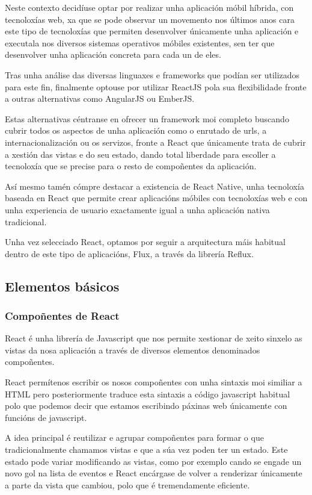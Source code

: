     Neste contexto decidíuse optar por realizar unha aplicación móbil 
híbrida, con tecnoloxías web, xa que se pode observar un movemento nos últimos 
anos cara este tipo de tecnoloxías que permiten desenvolver únicamente unha 
aplicación e executala nos diversos sistemas operativos móbiles existentes, sen 
ter que desenvolver unha aplicación concreta para cada un de eles.

    Tras unha análise das diversas linguaxes e frameworks que podían 
ser utilizados para este fin, finalmente optouse por utilizar ReactJS pola sua 
flexibilidade fronte a outras alternativas como AngularJS ou EmberJS.

    Estas alternativas céntranse en ofrecer un framework moi completo buscando 
cubrir todos os aspectos de unha aplicación como o enrutado 
de urls, a internacionalización ou os servizos, fronte a React que únicamente 
trata de cubrir a xestión das vistas e do seu estado, dando total liberdade 
para escoller a tecnoloxía que se precise para o resto de compoñentes da 
aplicación.

    Así mesmo tamén cómpre destacar a existencia de React Native, unha 
tecnoloxía baseada en React que permite crear aplicacións móbiles con 
tecnoloxías web e con unha experiencia de usuario exactamente igual a unha 
aplicación nativa tradicional.

    Unha vez selecciado React, optamos por seguir a arquitectura máis habitual 
dentro de este tipo de aplicacións, Flux, a través da librería Reflux.

    \subsection{Elementos básicos}
      \subsubsection{Compoñentes de React}
      React é unha librería de Javascript que nos permite xestionar de xeito 
sinxelo as vistas da nosa aplicación a través de diversos elementos denominados 
compoñentes.

      React permítenos escribir os nosos compoñentes con unha sintaxis moi 
similiar a HTML pero posteriormente traduce esta sintaxis a código javascript 
habitual polo que podemos decir que estamos escribindo páxinas web únicamente 
con funcións de javascript.

      A idea principal é reutilizar e agrupar compoñentes para formar o que 
tradicionalmente chamamos vistas e que a súa vez poden ter un estado.
      Este estado pode variar modificando as vistas, como por exemplo cando se 
engade un novo gol na lista de eventos e React encárgase de volver a 
renderizar únicamente a parte da vista que cambiou, polo que é tremendamente 
eficiente.

